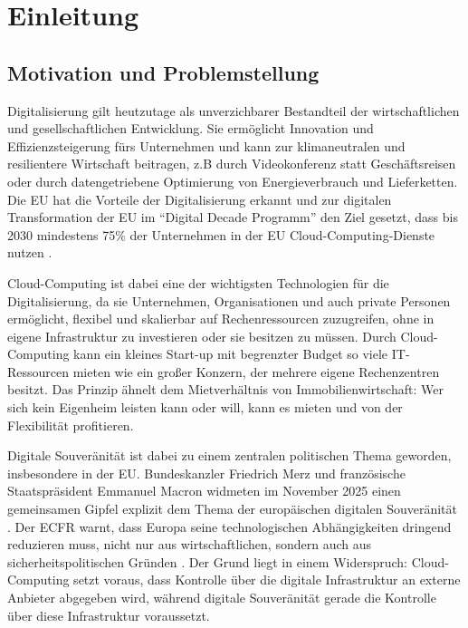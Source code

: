 \chapter{Einleitung}
\label{ch:intro}
%
%
\section{Motivation und Problemstellung}
\label{sec:intro:motivation}

Digitalisierung gilt heutzutage als unverzichbarer Bestandteil der wirtschaftlichen und gesellschaftlichen Entwicklung. 
Sie ermöglicht Innovation und Effizienzsteigerung fürs Unternehmen und kann zur klimaneutralen und resilientere Wirtschaft beitragen, z.B durch Videokonferenz statt Geschäftsreisen oder durch datengetriebene Optimierung von Energieverbrauch und Lieferketten. Die EU hat die Vorteile der Digitalisierung erkannt und zur digitalen Transformation der EU im ``Digital Decade Programm'' den Ziel gesetzt, dass bis 2030 mindestens 75\% der Unternehmen in der EU Cloud-Computing-Dienste nutzen \cite{ec2022digitaldecade}. 

Cloud-Computing ist dabei eine der wichtigsten Technologien für die Digitalisierung, da sie Unternehmen, Organisationen und auch private Personen ermöglicht, flexibel und skalierbar auf Rechenressourcen zuzugreifen, ohne in eigene Infrastruktur zu investieren oder sie besitzen zu müssen. Durch Cloud-Computing kann ein kleines Start-up mit begrenzter Budget so viele IT-Ressourcen mieten wie ein großer Konzern, der mehrere eigene Rechenzentren besitzt. Das Prinzip ähnelt dem Mietverhältnis von Immobilienwirtschaft: Wer sich kein Eigenheim leisten kann oder will, kann es mieten und von der Flexibilität profitieren.

Digitale Souveränität ist dabei zu einem zentralen politischen Thema geworden, insbesondere in der EU. Bundeskanzler Friedrich Merz und französische Staatspräsident Emmanuel Macron widmeten im November 2025 einen gemeinsamen Gipfel explizit dem Thema der europäischen digitalen Souveränität \cite{bundesregierung2025digitalgipfel}. Der \ac{ECFR} warnt, dass Europa seine technologischen Abhängigkeiten dringend reduzieren muss, nicht nur aus wirtschaftlichen, sondern auch aus sicherheitspolitischen Gründen \cite{ecfr2025eurostack}. Der Grund liegt in einem Widerspruch: Cloud-Computing setzt voraus, dass Kontrolle über die digitale Infrastruktur an externe Anbieter abgegeben wird, während digitale Souveränität gerade die Kontrolle über diese Infrastruktur voraussetzt.

